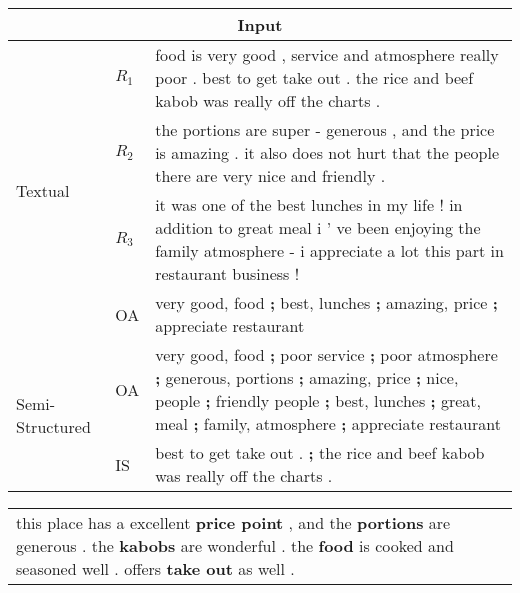 \begin{table}[th]
	\centering
	\small


	\begin{tabular}{|m{1.6cm}|m{0.28cm}<{\centering}|m{5.45cm}|}
	\hline
	\multicolumn{3}{|c|}{\rule{0pt}{10pt} \bf Input}  \\	
	\hline
	\multirow{4}{1.4cm}{Textual~\cite{Plansum20}} & $R_1$ & food is very good , service and atmosphere really poor . best to get take out . the rice and beef kabob was really off the charts .\\
	\cline{2-3}
	& $R_2$&the portions are super - generous , and the price is amazing . it also does not hurt that the people there are very nice and friendly .
\\
	\cline{2-3}
	& $R_3$ & it was one of the best lunches in my life ! in addition to great meal i ' ve been enjoying the family atmosphere - i appreciate a lot this part in restaurant business ! 
	\\
	\hline
   Structured~\cite{OpiDig20} & OA &  very good, food \textbf{;} best, lunches \textbf{;} amazing,  price \textbf{;} appreciate restaurant 
	\\
	\hline
	\multirow{2}{0.1cm}{Semi-Structured} & OA &very good, food \textbf{;} poor service \textbf{;} poor atmosphere \textbf{;} generous, portions \textbf{;} amazing,  price \textbf{;} nice, people \textbf{;} friendly people \textbf{;} best, lunches \textbf{;}  great, meal \textbf{;} family, atmosphere \textbf{;} appreciate restaurant\\
	\cline{2-3}
	& IS &best to get take out . \textbf{;} the rice and beef kabob was really off the charts .\\
	\hline
\end{tabular}

	\begin{tabular}{|p{8.05cm}|}
	\hline \rule{0pt}{10pt}
	\makecell[c]{\bf Reference Summary} \\
	\hline
	this place has a excellent \textbf{price point} , and the \textbf{portions} are generous . the \textbf{kabobs} are wonderful . the \textbf{food} is cooked and seasoned well . offers \textbf{take out} as well .
	\vspace{0.2em}\\
	\hline
\end{tabular}


\end{table}
